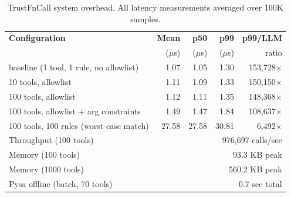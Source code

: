 \begin{table}[t]
\centering
\caption{TrustFnCall system overhead. All latency measurements averaged over 100K samples.}
\label{tab:system}
\small
\begin{tabular}{lrrrr}
\toprule
\textbf{Configuration} & \textbf{Mean} & \textbf{p50} & \textbf{p99} & \textbf{p99/LLM} \\
 & ($\mu$s) & ($\mu$s) & ($\mu$s) & ratio \\
\midrule
  baseline (1 tool, 1 rule, no allowlist) & 1.07 & 1.05 & 1.30 & 153,728$\times$ \\
  10 tools, allowlist & 1.11 & 1.09 & 1.33 & 150,150$\times$ \\
  100 tools, allowlist & 1.12 & 1.11 & 1.35 & 148,368$\times$ \\
  100 tools, allowlist + arg constraints & 1.49 & 1.47 & 1.84 & 108,637$\times$ \\
  100 tools, 100 rules (worst-case match) & 27.58 & 27.58 & 30.81 & 6,492$\times$ \\
\midrule
  Throughput (100 tools) & \multicolumn{4}{r}{976,697 calls/sec} \\
  Memory (100 tools) & \multicolumn{4}{r}{93.3 KB peak} \\
  Memory (1000 tools) & \multicolumn{4}{r}{560.2 KB peak} \\
  Pysa offline (batch, 70 tools) & \multicolumn{4}{r}{0.7 sec total} \\
\bottomrule
\end{tabular}
\end{table}